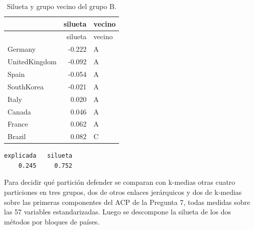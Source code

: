 \documentclass[oneside, openany, fontset=libertinus]{mitthesis}
\newenvironment{Shaded}{\begin{snugshade}}{\end{snugshade}}
\newcommand{\AttributeTok}[1]{\textcolor[rgb]{0.40,0.45,0.13}{#1}}
\newcommand{\CommentTok}[1]{\textcolor[rgb]{0.37,0.37,0.37}{#1}}
\newcommand{\DecValTok}[1]{\textcolor[rgb]{0.68,0.00,0.00}{#1}}
\newcommand{\FunctionTok}[1]{\textcolor[rgb]{0.28,0.35,0.67}{#1}}
\newcommand{\NormalTok}[1]{\textcolor[rgb]{0.00,0.23,0.31}{#1}}
\newcommand{\OtherTok}[1]{\textcolor[rgb]{0.00,0.23,0.31}{#1}}
\newcommand{\SpecialCharTok}[1]{\textcolor[rgb]{0.37,0.37,0.37}{#1}}
\newcommand{\StringTok}[1]{\textcolor[rgb]{0.13,0.47,0.30}{#1}}
\begin{document}
\Needspace{2.69in}

\begin{longtable}[]{@{}lrl@{}}
\caption{Silueta y grupo vecino del grupo B.}\tabularnewline
\toprule\noalign{}
& silueta & vecino \\
\midrule\noalign{}
\endfirsthead
\toprule\noalign{}
& silueta & vecino \\
\midrule\noalign{}
\endhead
\bottomrule\noalign{}
\endlastfoot
Germany & -0.222 & A \\
UnitedKingdom & -0.092 & A \\
Spain & -0.054 & A \\
SouthKorea & -0.021 & A \\
Italy & 0.020 & A \\
Canada & 0.046 & A \\
France & 0.062 & A \\
Brazil & 0.082 & C \\
\end{longtable}

\Needspace{1.14in}

\begin{Shaded}
\end{Shaded}

\begin{verbatim}
explicada   silueta 
    0.245     0.752 
\end{verbatim}

Para decidir qué partición defender se comparan con k-medias otras
cuatro particiones en tres grupos, dos de otros enlaces jerárquicos y
dos de k-medias sobre las primeras componentes del ACP de la Pregunta 7,
todas medidas sobre las 57 variables estandarizadas. Luego se descompone
la silueta de los dos métodos por bloques de países.

\Needspace{4.56in}
\end{document}
